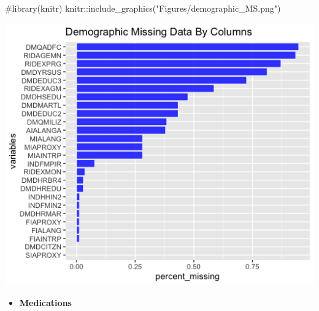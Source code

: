 \begin{Schunk}
\begin{Sinput}
#library(knitr)
knitr::include_graphics("Figures/demographic_MS.png")
\end{Sinput}


\begin{center}\includegraphics[width=7.15in]{Figures/demographic_MS} \end{center}

\end{Schunk}

\begin{itemize}
\tightlist
\item
  \textbf{Medications}
\end{itemize}

